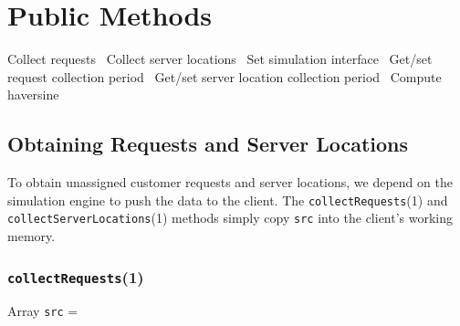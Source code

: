 \documentclass{article}
\def\nwendcode{\endtrivlist \endgroup}
\let\nwdocspar=\par
\begin{document}
\section{Public Methods}
\nwenddocs{}\endmoddef{}
  \LA{}Collect requests~{\nwtagstyle{}}\RA{}
  \LA{}Collect server locations~{\nwtagstyle{}}\RA{}
  \LA{}Set simulation interface~{\nwtagstyle{}}\RA{}
  \LA{}Get/set request collection period~{\nwtagstyle{}}\RA{}
  \LA{}Get/set server location collection period~{\nwtagstyle{}}\RA{}
  \LA{}Compute haversine~{\nwtagstyle{}}\RA{}
\nwendcode{}\nwdocspar

\subsection{Obtaining Requests and Server Locations}
To obtain unassigned customer requests and server locations, we depend on
the simulation engine to push the data to the client. The {\tt{}\protect{}\protect{}collectRequests}(1)
and {\tt{}\protect{}collectServerLocations}(1) methods simply copy {\tt{}src} into
the client's working memory.

\subsubsection{{\tt{}\protect{}collectRequests}(1)}
Array {\tt{}src} =

\noindent
{}
\end{document}
